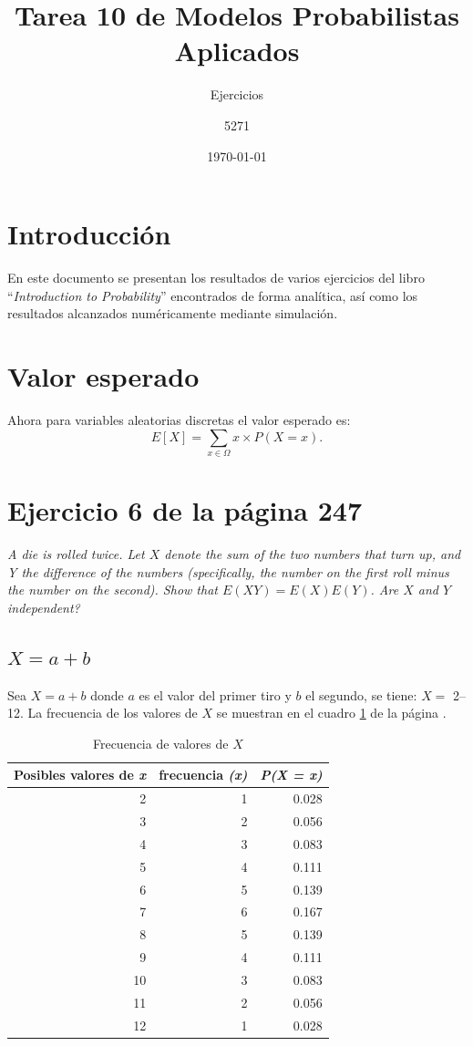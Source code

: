 \documentclass{article}
\title{Tarea 10 de Modelos Probabilistas Aplicados}
\subtitle{Ejercicios}
\author{5271}
\date{\today}
\begin{document}
\maketitle
\section{Introducción}
En este documento se presentan los resultados de varios ejercicios del libro ``\textit{Introduction to Probability}''\cite{libProba} encontrados de forma analítica, así como los resultados alcanzados numéricamente mediante simulación.
\section{Valor esperado}

Ahora para variables aleatorias discretas el valor esperado es:
\begin{equation}\label{eq:3}
 E[X] = \sum_{x \in \Omega} x
	      \times P(X = x).   
\end{equation}
\section{Ejercicio 6 de la página 247}
\emph{A die is rolled twice. Let $X$ denote the sum of the two numbers that turn up, and Y the difference of the numbers (specifically, the number on the first roll minus the number on the second). Show that $E(X Y) = E(X)E(Y )$. Are $X$ and $Y$ independent?}


\subsection{$X = a + b$}
Sea $X = a + b$ donde $a$ es el valor del primer tiro y $b$ el segundo, se tiene:
$ X =$ 2--12. La frecuencia de los valores de $X$ se muestran en el cuadro \ref{tab:1} de la página \pageref{tab:1}.

\begin{table}[H]
  \centering
  \caption{Frecuencia de valores de $X$}
    \begin{tabular}{rrr}
    \toprule
    \multicolumn{1}{p{5.39em}}{\textbf{Posibles valores de \textit{\textbf{x}}}} & \multicolumn{1}{l}{\textbf{frecuencia  \textit{\textbf{(x)}}}} & \multicolumn{1}{l}{\textit{\textbf{P(X = x)}}} \\
    \midrule
    2     & 1     & 0.028 \\
    3     & 2     & 0.056 \\
    4     & 3     & 0.083 \\
    5     & 4     & 0.111 \\
    6     & 5     & 0.139 \\
    7     & 6     & 0.167 \\
    8     & 5     & 0.139 \\
    9     & 4     & 0.111 \\
    10    & 3     & 0.083 \\
    11    & 2     & 0.056 \\
    12    & 1     & 0.028 \\
    \bottomrule
    \end{tabular}%
  \label{tab:1}%
\end{table}%
\end{document}
